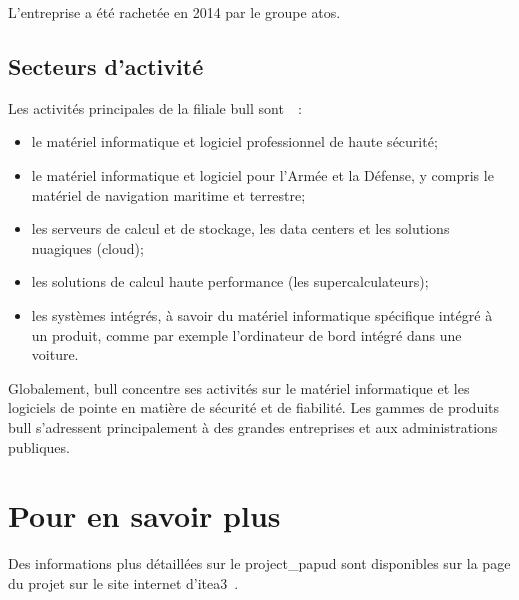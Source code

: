 L'entreprise a été rachetée en 2014 par le groupe \gls{atos}.

\pagebreak
\subsection{Secteurs d'activité}
Les activités principales de la filiale \gls{bull} sont~\autocite{bull_produits}~:
\begin{itemize}
	\item le matériel informatique et logiciel professionnel de haute sécurité;
	\item le matériel informatique et logiciel pour l'Armée et la Défense, y compris le matériel de navigation maritime et terrestre;
	\item les serveurs de calcul et de stockage, les \gls{data centers} et les solutions nuagiques (\gls{cloud});
	\item les solutions de calcul haute performance (les \og supercalculateurs\fg{});
	\item les systèmes intégrés, à savoir du matériel informatique spécifique intégré à un produit, comme par exemple l'ordinateur de bord intégré dans une voiture.
\end{itemize}
\vspace{1em}

Globalement, \gls{bull} concentre ses activités sur le matériel informatique et les logiciels de pointe en matière de sécurité et de fiabilité.
Les gammes de produits \gls{bull} s'adressent principalement à des grandes entreprises et aux administrations publiques.

\section*{Pour en savoir plus}
Des informations plus détaillées sur le \gls{project_papud} sont disponibles sur la page du projet sur le site internet d'\gls{itea3}~\autocite{about_papud}.
